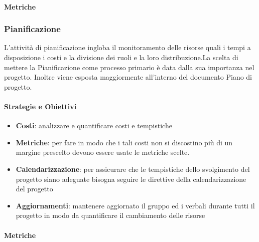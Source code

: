             
            \paragraph{Metriche}
            
            \hphantom{}
            \def\productquality{
            {   Percentuale dei requisiti soddisfatti,
                $ \frac{ReqSoddisfatti}{ReqTotali}$, 
                $ 100 \% $,
                $ 100 \% $
            },
        }
        
            
            
          
        \newpage    
        \subsubsection{Pianificazione}
        L'attività di pianificazione ingloba il monitoramento delle risorse quali i tempi a disposizione i costi e la divisione dei ruoli e la loro distribuzione.La scelta di mettere la Pianificazione come processo primario è data dalla sua importanza nel progetto. Inoltre viene esposta maggiormente all'interno del documento Piano di progetto.
            \paragraph{Strategie e Obiettivi}
                \begin{itemize}
                    \item \textbf{Costi}: analizzare e quantificare costi e tempistiche
                    \item \textbf{Metriche}: per fare in modo che i  tali costi non si discostino più di un margine prescelto devono essere usate le metriche scelte.
                    \item \textbf{Calendarizzazione}: per assicurare che le tempistiche dello svolgimento del progetto siano adeguate bisogna seguire le direttive della calendarizzazione del progetto
                    \item \textbf{Aggiornamenti}: mantenere aggiornato il gruppo ed i verbali durante tutti il progetto in modo da quantificare il cambiamento delle risorse
                \end{itemize}
                
           \paragraph{Metriche}
            
